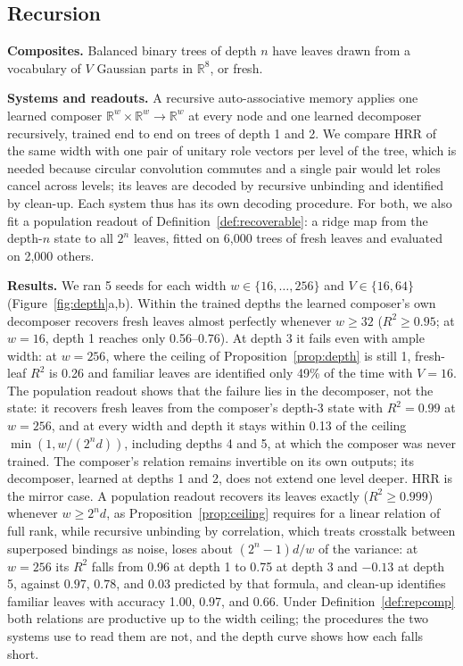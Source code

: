 \documentclass[10pt]{article}
\theoremstyle{plain}
\theoremstyle{remark}
\newcommand{\R}{\mathbb{R}}
\begin{document}
\subsection{Recursion}
\label{sec:depth}

\textbf{Composites.} Balanced binary trees of depth $n$ have leaves drawn from a vocabulary of $V$ Gaussian parts in $\R^8$, or fresh.

\textbf{Systems and readouts.} A recursive auto-associative memory \citep{pollack1990} applies one learned composer $\R^w \times \R^w \to \R^w$ at every node and one learned decomposer recursively, trained end to end on trees of depth 1 and 2. We compare HRR of the same width with one pair of unitary role vectors per level of the tree, which is needed because circular convolution commutes and a single pair would let roles cancel across levels; its leaves are decoded by recursive unbinding and identified by clean-up. Each system thus has its own decoding procedure. For both, we also fit a population readout of Definition~\ref{def:recoverable}: a ridge map from the depth-$n$ state to all $2^n$ leaves, fitted on 6{,}000 trees of fresh leaves and evaluated on 2{,}000 others.

\textbf{Results.} We ran 5 seeds for each width $w \in \{16, \ldots, 256\}$ and $V \in \{16, 64\}$ (Figure~\ref{fig:depth}a,b). Within the trained depths the learned composer's own decomposer recovers fresh leaves almost perfectly whenever $w \ge 32$ ($R^2 \ge 0.95$; at $w = 16$, depth 1 reaches only 0.56--0.76). At depth 3 it fails even with ample width: at $w = 256$, where the ceiling of Proposition~\ref{prop:depth} is still 1, fresh-leaf $R^2$ is 0.26 and familiar leaves are identified only 49\% of the time with $V = 16$. The population readout shows that the failure lies in the decomposer, not the state: it recovers fresh leaves from the composer's depth-3 state with $R^2 = 0.99$ at $w = 256$, and at every width and depth it stays within 0.13 of the ceiling $\min(1, w/(2^n d))$, including depths 4 and 5, at which the composer was never trained. The composer's relation remains invertible on its own outputs; its decomposer, learned at depths 1 and 2, does not extend one level deeper. HRR is the mirror case. A population readout recovers its leaves exactly ($R^2 \ge 0.999$) whenever $w \ge 2^n d$, as Proposition~\ref{prop:ceiling} requires for a linear relation of full rank, while recursive unbinding by correlation, which treats crosstalk between superposed bindings as noise, loses about $(2^n - 1)d/w$ of the variance: at $w = 256$ its $R^2$ falls from 0.96 at depth 1 to 0.75 at depth 3 and $-0.13$ at depth 5, against $0.97$, $0.78$, and $0.03$ predicted by that formula, and clean-up identifies familiar leaves with accuracy 1.00, 0.97, and 0.66. Under Definition~\ref{def:repcomp} both relations are productive up to the width ceiling; the procedures the two systems use to read them are not, and the depth curve shows how each falls short.
\end{document}
